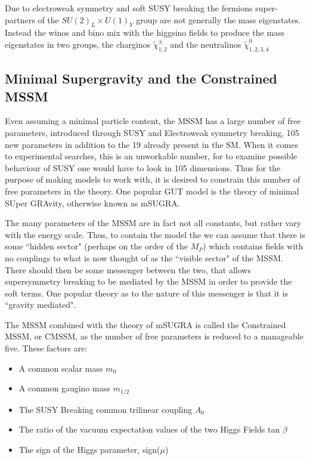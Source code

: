 Due to electroweak symmetry and soft SUSY breaking the fermions super-partners of the $SU(2)_{L} \times U(1)_{Y}$ group are not generally the mass eigenstates. Instead the winos and bino mix with the higgsino fields to produce the mass eigenstates in two groups, the charginos $\tilde{\chi}^{\pm}_{1,2}$ and the neutralinos $\tilde{\chi}^{0}_{1,2,3,4}$


\subsection{Minimal Supergravity and the Constrained MSSM}

Even assuming a minimal particle content, the MSSM has a large number of free parameters, introduced through SUSY and Electroweak symmetry breaking, 105 new parameters in addition to the 19 already present in the SM. When it comes to experimental searches, this is an unworkable number, for to examine possible behaviour of SUSY one would have to look in 105 dimensions. Thus for the purpose of making models to work with, it is desired to constrain this number of free parameters in the theory. One popular GUT model is the theory of minimal SUper GRAvity, otherwise known as mSUGRA. 

The many parameters of the MSSM are in fact not all constants, but rather vary with the energy scale. Thus, to contain the model the we can assume that there is some ``hidden sector" (perhaps on the order of the $M_{P}$) which contains fields with no couplings to what is now thought of as the ``visible sector" of the MSSM. There should then be some messenger between the two, that allows supersymmetry breaking to be mediated by the MSSM in order to provide the soft terms. One popular theory as to the nature of this messenger is that it is ``gravity mediated". 

The MSSM combined with the theory of mSUGRA is called the Constrained MSSM, or CMSSM, as the number of free parameters is reduced to a manageable five. These factors are:

\begin{itemize}
\item{A common scalar mass $m_{0}$}
\item{A common gaugino mass $m_{1/2}$}
\item{The SUSY Breaking common trilinear coupling $A_{0}$}
\item{The ratio of the vacuum expectation values of the two Higgs Fields tan $\beta$}
\item{ The sign of the Higgs parameter, sign($\mu$)}
\end{itemize} 

